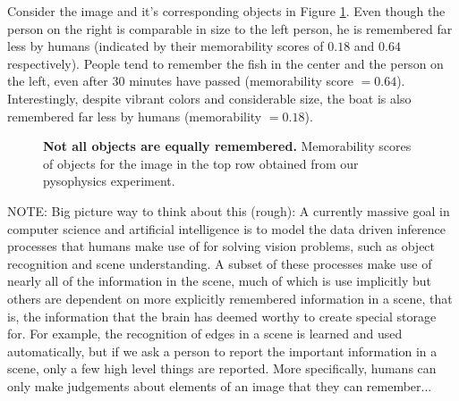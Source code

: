 Consider the image and it's corresponding objects in Figure \ref{fig:introPhoto}. Even though the person on the right is comparable in size to the left person, he is remembered far less by humans (indicated by their memorability scores of $0.18$ and $0.64$ respectively). People tend to remember the fish in the center and the person on the left, even after $30$ minutes have passed (memorability score $= 0.64$). Interestingly, despite vibrant colors and considerable size, the boat is also remembered far less by humans (memorability $= 0.18$).


\begin{figure}[t]
\centering
{}
\vspace{-5mm}\caption{\footnotesize\textbf{Not all objects are equally remembered.} Memorability scores of objects for the image in the top row obtained from our pysophysics experiment. }\label{fig:introPhoto}
\end{figure}

NOTE: Big picture way to think about this (rough): A currently massive goal in computer science and artificial intelligence is to model the data driven inference processes that humans make use of for solving vision problems, such as object recognition and scene understanding. A subset of these processes make use of nearly all of the information in the scene, much of which is use implicitly but others are dependent on more explicitly remembered information in a scene, that is, the information that the brain has deemed worthy to create special storage for. For example, the recognition of edges in a scene is learned and used automatically, but if we ask a person to report the important information in a scene, only a few high level things are reported. More specifically, humans can only make judgements about elements of an image that they can remember...

